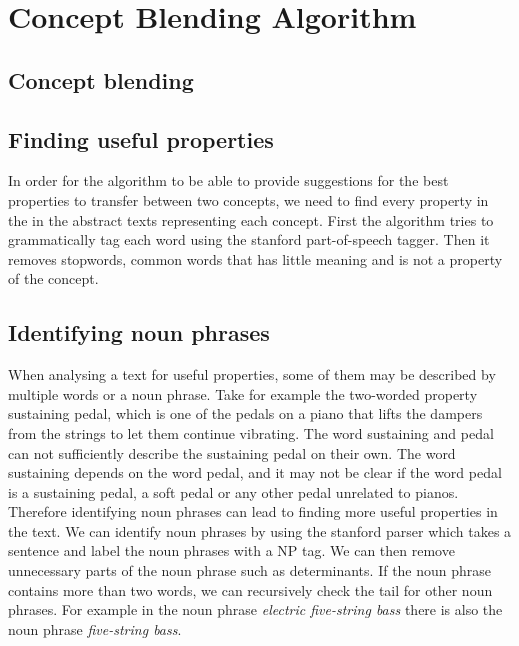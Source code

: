 
\chapter{Concept Blending Algorithm} %

\label{Chapter5} %


\section{Concept blending}


\section{Finding useful properties}
In order for the algorithm to be able to provide suggestions for the best properties to transfer between two concepts, we need to find every property in the in the abstract texts representing each concept. First the algorithm tries to grammatically tag each word using the stanford part-of-speech tagger. Then it removes stopwords, common words that has little meaning and is not a property of the concept.


\section{Identifying noun phrases}
When analysing a text for useful properties, some of them may be described by multiple words or a noun phrase. Take for example the two-worded property sustaining pedal, which is one of the pedals on a piano that lifts the dampers from the strings to let them continue vibrating. The word sustaining and pedal can not sufficiently describe the sustaining pedal on their own. The word sustaining depends on the word pedal, and it may not be clear if the word pedal is a sustaining pedal, a soft pedal or any other pedal unrelated to pianos. Therefore identifying noun phrases can lead to finding more useful properties in the text. We can identify noun phrases by using the stanford parser which takes a sentence and label the noun phrases with a NP tag. We can then remove unnecessary parts of the noun phrase such as determinants. If the noun phrase contains more than two words, we can recursively check the tail for other noun phrases. For example in the noun phrase \emph{electric five-string bass} there is also the noun phrase \emph{five-string bass}.

